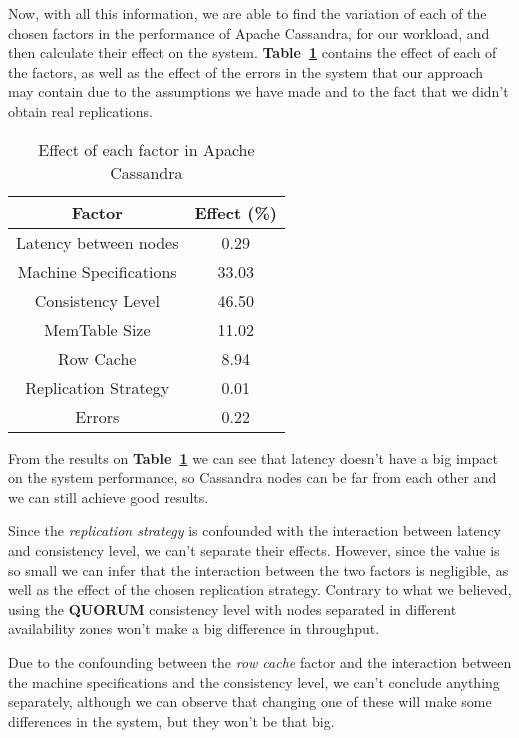 \documentclass[runningheads]{llncs}
\begin{document}
Now, with all this information, we are able to find the variation of each of the chosen factors in the performance of Apache Cassandra, for our workload, and then calculate their effect on the system. \textbf{Table~\ref{Tab:effects}} contains the effect of each of the factors, as well as the effect of the errors in the system that our approach may contain due to the assumptions we have made and to the fact that we didn't obtain real replications.

\begin{table}[H]
  \caption{Effect of each factor in Apache Cassandra}
  \centering
  \begin{tabular}{|c|c|}
    \hline
    Factor & Effect (\%) \\
    \hline
    Latency between nodes   &  0.29 \\
    \hline
    Machine Specifications  & 33.03 \\
    \hline
    Consistency Level       & 46.50 \\
    \hline
    MemTable Size           & 11.02 \\
    \hline
    Row Cache               &  8.94 \\
    \hline
    Replication Strategy    &  0.01 \\
    \hline
    Errors                  &  0.22 \\
    \hline
  \end{tabular}
  \label{Tab:effects}
\end{table}

From the results on \textbf{Table~\ref{Tab:effects}} we can see that latency doesn't have a big impact on the system performance, so Cassandra nodes can be far from each other and we can still achieve good results.

Since the \emph{replication strategy} is confounded with the interaction between latency and consistency level, we can't separate their effects. However, since the value is so small we can infer that the interaction between the two factors is negligible, as well as the effect of the chosen replication strategy. Contrary to what we believed, using the \textbf{QUORUM} consistency level with nodes separated in different availability zones won't make a big difference in throughput.

Due to the confounding between the \emph{row cache} factor and the interaction between the machine specifications and the consistency level, we can't conclude anything separately, although we can observe that changing one of these will make some differences in the system, but they won't be that big.
\end{document}
